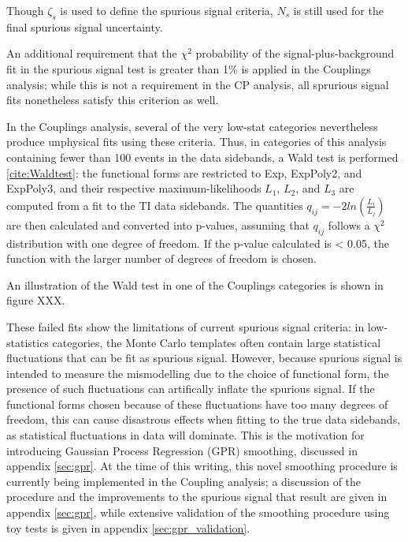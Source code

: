 Though $\zeta_{s}$ is used to define the spurious signal criteria, $N_{s}$ is still used for the final spurious signal uncertainty. 

\begin{figure}
\end{figure} 


An additional requirement that the $\chi^{2}$ probability of the signal-plus-background fit in the spurious signal test is greater than 1\% is applied in the Couplings analysis; while this is not a requirement in the CP analysis, all sprurious signal fits nonetheless satisfy this criterion as well.

In the Couplings analysis, several of the very low-stat categories nevertheless produce unphysical fits using these criteria. Thus, in categories of this analysis containing fewer than 100 events in the data sidebands, a Wald test is performed \ref{cite:Waldtest}: the functional forms are restricted to Exp, ExpPoly2, and ExpPoly3, and their respective maximum-likelihoods $L_{1}$, $L_{2}$, and $L_{3}$ are computed from a fit to the TI data sidebands. The quantities $q_{ij} = -2 ln(\frac{L_{i}}{L_{j}})$ are then calculated and converted into p-values, assuming that  $q_{ij}$ follows a $\chi^{2}$ distribution with one degree of freedom. If the p-value calculated is < 0.05, the function with the larger number of degrees of freedom is chosen. 

An illustration of the Wald test in one of the Couplings categories is shown in figure XXX.

\begin{figure}
\end{figure} 

These failed fits show the limitations of current spurious signal criteria: in low-statistics categories, the Monte Carlo templates often contain large statistical fluctuations that can be fit as spurious signal. However, because spurious signal is intended to measure the mismodelling due to the choice of functional form, the presence of such fluctuations can artifically inflate the spurious signal. If the functional forms chosen because of these fluctuations have too many degrees of freedom, this can cause disastrous effects when fitting to the true data sidebands, as statistical fluctuations in data will dominate. This is the motivation for introducing Gaussian Process Regression (GPR) smoothing, discussed in appendix \ref{sec:gpr}. At the time of this writing, this novel smoothing procedure is currently being implemented in the Coupling analysis; a discussion of the procedure and the improvements to the spurious signal that result are given in appendix \ref{sec:gpr}, while extensive validation of the smoothing procedure using toy tests is given in appendix \ref{sec:gpr_validation}.

